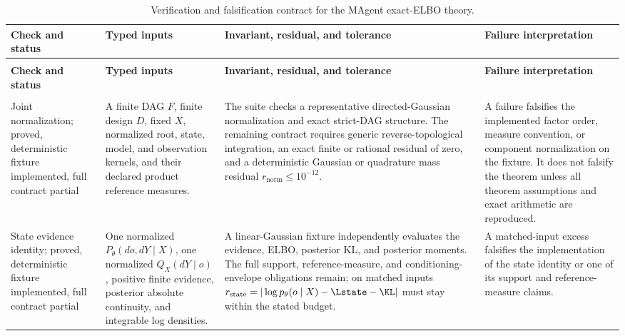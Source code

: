 \scriptsize
\begin{longtable}{>{\raggedright\arraybackslash}p{}>{\raggedright\arraybackslash}p{}>{\raggedright\arraybackslash}p{}>{\raggedright\arraybackslash}p{}}
\caption{Verification and falsification contract for the MAgent exact-ELBO theory.}
\label{tab:magent-verification-oracles}\\
\toprule
\textbf{Check and status} & \textbf{Typed inputs} & \textbf{Invariant, residual, and tolerance} & \textbf{Failure interpretation} \\
\midrule
\endfirsthead
\multicolumn{4}{l}{\textit{Table \thetable\ continued}}\\
\toprule
\textbf{Check and status} & \textbf{Typed inputs} & \textbf{Invariant, residual, and tolerance} & \textbf{Failure interpretation} \\
\midrule
\endhead
\midrule
\multicolumn{4}{r}{\textit{Continued on next page}}\\
\endfoot
\bottomrule
\endlastfoot
Joint normalization; proved, deterministic fixture implemented, full contract partial & A finite DAG \(F\), finite design \(D\), fixed \(X\), normalized root, state, model, and observation kernels, and their declared product reference measures. & The suite checks a representative directed-Gaussian normalization and exact strict-DAG structure. The remaining contract requires generic reverse-topological integration, an exact finite or rational residual of zero, and a deterministic Gaussian or quadrature mass residual \(r_{\mathrm{norm}}\leq10^{-12}\). & A failure falsifies the implemented factor order, measure convention, or component normalization on the fixture. It does not falsify the theorem unless all theorem assumptions and exact arithmetic are reproduced. \\
\addlinespace
State evidence identity; proved, deterministic fixture implemented, full contract partial & One normalized \(P_\theta(do,dY\mid X)\), one normalized \(Q_X(dY\mid o)\), positive finite evidence, posterior absolute continuity, and integrable log densities. & A linear-Gaussian fixture independently evaluates the evidence, ELBO, posterior KL, and posterior moments. The full support, reference-measure, and conditioning-envelope obligations remain; on matched inputs \(r_{\mathrm{state}}=|\log p_\theta(o\mid X)-\Lstate-\KL|\) must stay within the stated budget. & A matched-input excess falsifies the implementation of the state identity or one of its support and reference-measure claims. \\

\end{longtable}

